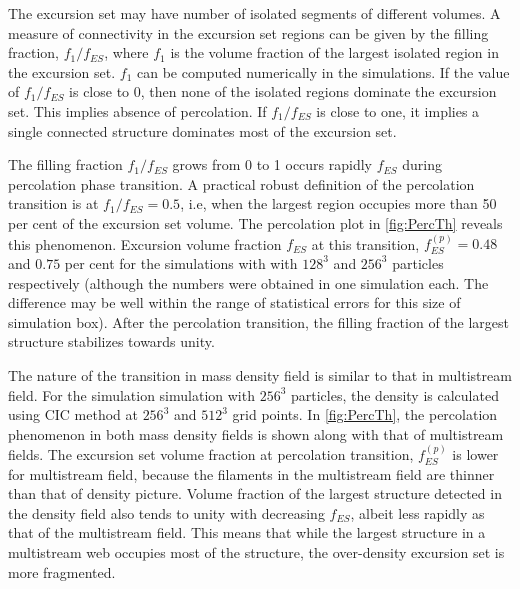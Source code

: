 \documentclass[fleqn,usenatbib,useAMS]{mnras}
\begin{document}
The excursion set may have number of isolated segments of different volumes. A measure of connectivity in the excursion set regions can be given by the filling fraction, $f_1/f_{ES}$, where $f_1$ is the volume fraction of the largest isolated region in the excursion set. $f_1$ can be computed numerically in the simulations. If the value of $f_1/f_{ES}$ is close to 0, then none of the isolated regions dominate the excursion set. This implies absence of percolation. If $f_1/f_{ES}$ is close to one, it implies a single connected structure dominates most of the excursion set. 


The filling fraction $f_1/f_{ES}$ grows from 0 to 1 occurs rapidly $f_{ES}$ during percolation phase transition. A practical robust definition of the percolation transition is at $f_1/f_{ES} = 0.5$, i.e, when the  largest region occupies more than 50 per cent of the excursion set volume. The percolation plot in \autoref{fig:PercTh} reveals this phenomenon. Excursion volume fraction $f_{ES}$ at this transition, $f_{ES}^{(p)} = 0.48$ and $0.75$ per cent for the simulations with with $128^3$ and $256^3$ particles respectively (although the numbers were obtained in one simulation each. The difference may be well within the range of statistical errors for this size of simulation box). After the percolation transition, the filling fraction of the largest structure stabilizes towards unity. 


The nature of the transition in mass density field is similar to that in multistream field. For the simulation simulation with $256^3$ particles, the density is calculated using CIC method at $256^3$ and $512^3$ grid points. In \autoref{fig:PercTh}, the percolation phenomenon in both mass density fields is shown along with that of multistream fields. The excursion set volume fraction at percolation transition, $f_{ES}^{(p)}$ is lower for multistream field, because the filaments in the multistream field are thinner than that of density picture. Volume fraction of the largest structure detected in the density field also tends to unity with decreasing $f_{ES}$, albeit less rapidly as that of the multistream field. This means that while the largest structure in a multistream web occupies most of the structure, the over-density excursion set is more fragmented.
  
\end{document}
